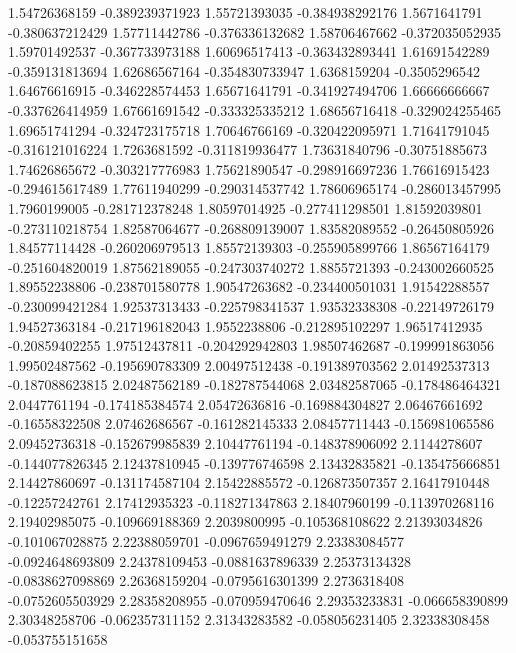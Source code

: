   1.54726368159  -0.389239371923
  1.55721393035  -0.384938292176
   1.5671641791  -0.380637212429
  1.57711442786  -0.376336132682
  1.58706467662  -0.372035052935
  1.59701492537  -0.367733973188
  1.60696517413  -0.363432893441
  1.61691542289  -0.359131813694
  1.62686567164  -0.354830733947
   1.6368159204    -0.3505296542
  1.64676616915  -0.346228574453
  1.65671641791  -0.341927494706
  1.66666666667  -0.337626414959
  1.67661691542  -0.333325335212
  1.68656716418  -0.329024255465
  1.69651741294  -0.324723175718
  1.70646766169  -0.320422095971
  1.71641791045  -0.316121016224
   1.7263681592  -0.311819936477
  1.73631840796   -0.30751885673
  1.74626865672  -0.303217776983
  1.75621890547  -0.298916697236
  1.76616915423  -0.294615617489
  1.77611940299  -0.290314537742
  1.78606965174  -0.286013457995
   1.7960199005  -0.281712378248
  1.80597014925  -0.277411298501
  1.81592039801  -0.273110218754
  1.82587064677  -0.268809139007
  1.83582089552   -0.26450805926
  1.84577114428  -0.260206979513
  1.85572139303  -0.255905899766
  1.86567164179  -0.251604820019
  1.87562189055  -0.247303740272
   1.8855721393  -0.243002660525
  1.89552238806  -0.238701580778
  1.90547263682  -0.234400501031
  1.91542288557  -0.230099421284
  1.92537313433  -0.225798341537
  1.93532338308   -0.22149726179
  1.94527363184  -0.217196182043
   1.9552238806  -0.212895102297
  1.96517412935   -0.20859402255
  1.97512437811  -0.204292942803
  1.98507462687  -0.199991863056
  1.99502487562  -0.195690783309
  2.00497512438  -0.191389703562
  2.01492537313  -0.187088623815
  2.02487562189  -0.182787544068
  2.03482587065  -0.178486464321
   2.0447761194  -0.174185384574
  2.05472636816  -0.169884304827
  2.06467661692   -0.16558322508
  2.07462686567  -0.161282145333
  2.08457711443  -0.156981065586
  2.09452736318  -0.152679985839
  2.10447761194  -0.148378906092
   2.1144278607  -0.144077826345
  2.12437810945  -0.139776746598
  2.13432835821  -0.135475666851
  2.14427860697  -0.131174587104
  2.15422885572  -0.126873507357
  2.16417910448   -0.12257242761
  2.17412935323  -0.118271347863
  2.18407960199  -0.113970268116
  2.19402985075  -0.109669188369
   2.2039800995  -0.105368108622
  2.21393034826  -0.101067028875
  2.22388059701  -0.0967659491279
  2.23383084577  -0.0924648693809
  2.24378109453  -0.0881637896339
  2.25373134328  -0.0838627098869
  2.26368159204  -0.0795616301399
   2.2736318408  -0.0752605503929
  2.28358208955  -0.070959470646
  2.29353233831  -0.066658390899
  2.30348258706  -0.062357311152
  2.31343283582  -0.058056231405
  2.32338308458  -0.053755151658
